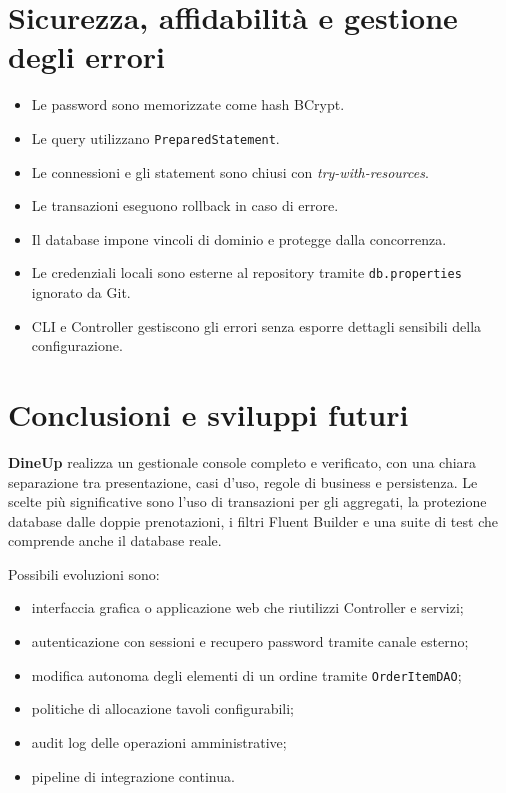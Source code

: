 \documentclass[12pt,a4paper]{article}
\newcommand{\project}{\textbf{DineUp}}
\newcommand{\code}[1]{\nolinkurl{#1}}
\begin{document}
\section{Sicurezza, affidabilità e gestione degli errori}

\begin{itemize}[leftmargin=*]
  \item Le password sono memorizzate come hash BCrypt.
  \item Le query utilizzano \code{PreparedStatement}.
  \item Le connessioni e gli statement sono chiusi con
        \emph{try-with-resources}.
  \item Le transazioni eseguono rollback in caso di errore.
  \item Il database impone vincoli di dominio e protegge dalla concorrenza.
  \item Le credenziali locali sono esterne al repository tramite
        \code{db.properties} ignorato da Git.
  \item CLI e Controller gestiscono gli errori senza esporre dettagli sensibili
        della configurazione.
\end{itemize}

\section{Conclusioni e sviluppi futuri}

\project{} realizza un gestionale console completo e verificato, con una chiara
separazione tra presentazione, casi d'uso, regole di business e persistenza. Le
scelte più significative sono l'uso di transazioni per gli aggregati, la
protezione database dalle doppie prenotazioni, i filtri Fluent Builder e una
suite di test che comprende anche il database reale.

Possibili evoluzioni sono:

\begin{itemize}[leftmargin=*]
  \item interfaccia grafica o applicazione web che riutilizzi Controller e servizi;
  \item autenticazione con sessioni e recupero password tramite canale esterno;
  \item modifica autonoma degli elementi di un ordine tramite
        \code{OrderItemDAO};
  \item politiche di allocazione tavoli configurabili;
  \item audit log delle operazioni amministrative;
  \item pipeline di integrazione continua.
\end{itemize}
\end{document}
